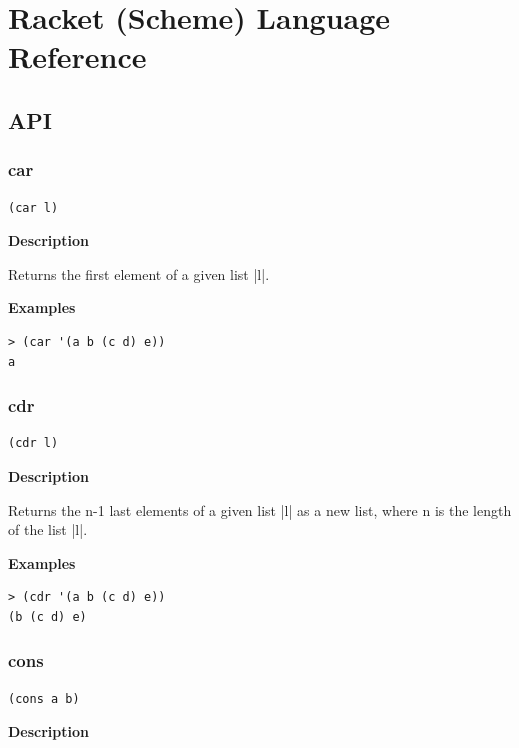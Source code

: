 \documentclass[a4paper]{article}
\begin{document}
\newpage

\section{Racket (Scheme) Language Reference}

\subsection{API}

\subsubsection{car}

\begin{lstlisting}[frame=none]
(car l)
\end{lstlisting}

\textbf{Description}

Returns the first element of a given list |l|.

\textbf{Examples}

\begin{lstlisting}
> (car '(a b (c d) e))
a
\end{lstlisting}

\subsubsection{cdr}

\begin{lstlisting}[frame=none]
(cdr l)
\end{lstlisting}

\textbf{Description}

Returns the n-1 last elements of a given list |l| as a new list, where n is the length of the list |l|.

\textbf{Examples}

\begin{lstlisting}
> (cdr '(a b (c d) e))
(b (c d) e)
\end{lstlisting}

\subsubsection{cons}

\begin{lstlisting}[frame=none]
(cons a b)
\end{lstlisting}

\textbf{Description}
\end{document}
